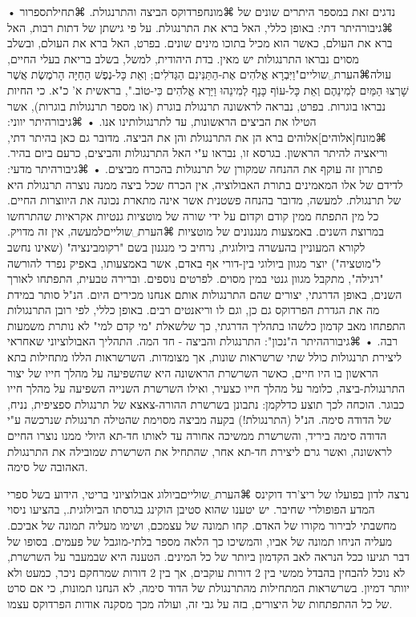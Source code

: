 נדגים זאת במספר היתרים שונים של ⌘מונח{פרדוקס הביצה והתרנגולת}. 
⌘תחילת{ספרור}
• ⌘גיבור{היתר דתי:} באופן כללי, האל ברא את התרנגולת. על פי גישתן של דתות רבות, האל ברא את העולם, כאשר הוא מכיל בתוכו מינים שונים. בפרט, האל ברא את העולם, ובשלב מסוים נבראו התרנגולות יש מאין. בדת היהודית, למשל, בשלב בריאת בעלי החיים, עולה⌘הערת␣שוליים{"וַיִּבְרָא אֱלֹהִים אֶת-הַתַּנִּינִם הַגְּדֹלִים; וְאֵת כָּל-נֶפֶשׁ הַחַיָּה הָרֹמֶשֶׂת אֲשֶׁר שָׁרְצוּ הַמַּיִם לְמִינֵהֶם וְאֵת כָּל-עוֹף כָּנָף לְמִינֵהוּ וַיַּרְא אֱלֹהִים כִּי-טוֹב.", בראשית א' כ"א.} כי החיות נבראו בוגרות. בפרט, נבראה לראשונה תרנגולת בוגרת (או מספר תרנגולות בוגרות), אשר הטילו את הביצים הראשונות, עד לתרנגולותינו אנו. 
• ⌘גיבור{היתר יווני:} ⌘מונח[אלוהים]{אלוהים} ברא הן את התרנגולת והן את הביצה. מדובר גם כאן בהיתר דתי, וריאציה להיתר הראשון. בגרסא זו, נבראו ע"י האל התרנגולות והביצים, כרעם ביום בהיר. פתרון זה עוקף את ההנחה שמקורן של תרנגולות בהכרח מביצים.
• ⌘גיבור{היתר מדעי:} לדידם של אלו המאמינים בתורת האבולוציה, אין הכרח שכל ביצה ממנה נוצרה תרנגולת היא של תרנגולת. למעשה, מדובר בהנחה פשטנית אשר אינה מתארת נכונה את היווצרות החיים. כל מין התפתח ממין קודם וקדום על ידי שורה של מוטציות גנטיות אקראיות שהתרחשו במרוצת השנים. באמצעות מנגנונים של מוטציות ⌘הערת␣שוליים{למעשה, אין זה מדויק. לקורא המעוניין בהעשרה ביולוגית, נרחיב כי מנגנון בשם "רקומבינציה" (שאינו נחשב ל"מוטציה") יוצר מגוון ביולוגי בין-דורי אף באדם, אשר באמצעותו, באפיק נפרד להורשה "רגילה", מתקבל מגוון גנטי במין מסוים. לפרטים נוספים.} וברירה טבעית, התפתחו לאורך השנים, באופן הדרגתי, יצורים שהם התרנגולות אותם אנחנו מכירים היום. הנ"ל סותר במידת מה את הגדרת הפרדוקס גם כן, וגם לו וריאנטים רבים. באופן כללי, לפי רובן התרנגולות התפתחו מאב קדמון כלשהו בתהליך הדרגתי, כך שלשאלת "מי קדם למי" לא נותרת משמעות רבה. 
• ⌘גיבור{ההיתר ה"נכון":} התרנגולת והביצה - חד המה. התהליך האבולוציוני שאחראי ליצירת תרנגולות כולל שתי שרשראות שונות, אך מצומדות. השרשראות הללו מתחילות בתא הראשון בו היו חיים, כאשר השרשרת הראשונה היא שהשפיעה על מהלך חייו של יצור התרנגולת-ביצה, כלומר על מהלך חייו כצעיר, ואילו השרשרת השנייה השפיעה על מהלך חייו כבוגר. הוכחה לכך תוצע כדלקמן: נתבונן בשרשרת ההורה-צאצא של תרנגולת ספציפית, נניח, של הדודה סימה. הנ"ל (התרנגולת!) בקעה מביצה מסוימת שהטילה תרנגולת שנרכשה ע"י הדודה סימה ביריד, והשרשרת ממשיכה אחורה עד לאותו חד-תא היולי ממנו נוצרו החיים לראשונה, ואשר גרם ליצירת חד-תא אחר, שהתחיל את השרשרת שמובילה את התרנגולת האהובה של סימה.

נרצה לדון בפועלו של ריצ'רד דוקינס ⌘הערת␣שוליים{ביולוג אבולוציוני בריטי, הידוע בשל ספרי המדע הפופולרי שחיבר. יש יטענו שהוא סטיבן הוקינג בגרסתו הביולוגית.}, בהציעו ניסוי מחשבתי לבירור מקורו של האדם. קחו תמונה של עצמכם, ושימו מעליה תמונה של אביכם. מעליה הניחו תמונה של אביו, והמשיכו כך הלאה מספר בלתי-מוגבל של פעמים. בסופו של דבר תגיעו ככל הנראה לאב הקדמון ביותר של כל המינים. הטענה היא שבמעבר על השרשרת, לא נוכל להבחין בהבדל ממשי בין 2 דורות עוקבים, אך בין 2 דורות שמרחקם ניכר, כמעט ולא יוותר דמיון. בשרשראות המתחילות מהתרנגולת של הדוד סימה, לא הנחנו תמונות, כי אם סרט של כל ההתפתחות של היצורים, בזה על גבי זה, ועולה מכך מסקנה אודות הפרדוקס עצמו.

